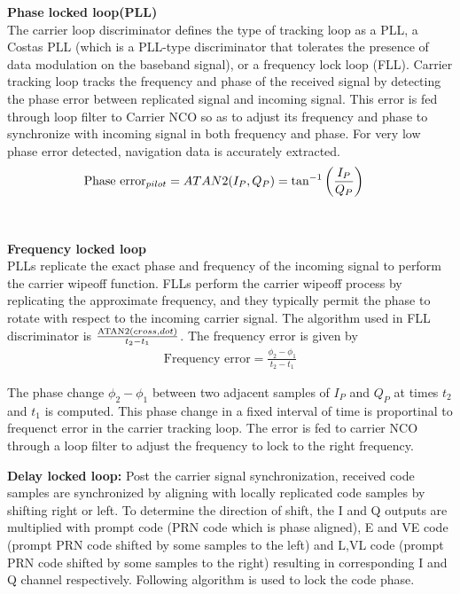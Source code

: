 \documentclass[conference]{IEEEtran}
\begin{document}
\noindent\textbf{Phase locked loop(PLL)}\\
The carrier loop discriminator defines the type of tracking loop as a PLL, a Costas PLL 
(which is a PLL-type discriminator that tolerates the presence of data modulation on the baseband 
signal), or a frequency lock loop (FLL). Carrier tracking loop tracks the frequency and phase of 
the received signal by detecting the phase error between replicated signal and incoming signal. 
This error is fed through loop filter to Carrier NCO so as to adjust its frequency and phase to 
synchronize with incoming signal in both frequency and phase. For very low phase error detected, 
navigation data is accurately extracted. 
\begin{align}
  \text{Phase error}_{pilot} &=ATAN2(I_P,Q_P) = \tan^{-1}\left(\frac{I_P}{Q_P}\right)
\end{align}
\\
\\
\noindent\textbf{Frequency locked loop}\\
PLLs replicate the exact phase and frequency of the incoming signal to perform the 
carrier wipeoff function. FLLs perform the carrier wipeoff process by replicating the approximate 
frequency, and they typically permit the phase to rotate with respect to the incoming carrier signal.
The algorithm used in FLL discriminator is $\frac{\text{ATAN2}{\ensuremath{\left(cross,dot\right)}}}{t_2-t_1}$. 
The frequency error is given by 
\begin{align}
	\text{Frequency error} = \frac{\phi_2-\phi_1}{t_2-t_1}
\end{align}

\noindent The phase change $\phi_2 - \phi_1$ between two adjacent samples of $I_{P}$ and $Q_{P}$ 
at times $t_2$ and $t_1$ is computed. This phase change in a fixed interval of time is proportinal 
to frequenct error in the carrier tracking loop. The error is fed to carrier NCO through a loop filter 
to adjust the frequency to lock to the right frequency.


\noindent\textbf{Delay locked loop:}
Post the carrier signal synchronization, received code samples are synchronized by aligning 
with locally replicated code samples by shifting right or left. To determine the direction of shift, 
the I and Q outputs are multiplied with prompt code (PRN code which is phase aligned), 
E and VE code (prompt PRN code shifted by some samples to the left) and L,VL code (prompt PRN code 
shifted by some samples to the right) resulting in corresponding I and Q channel respectively. 
Following algorithm is used to lock the code phase.
\end{document}
